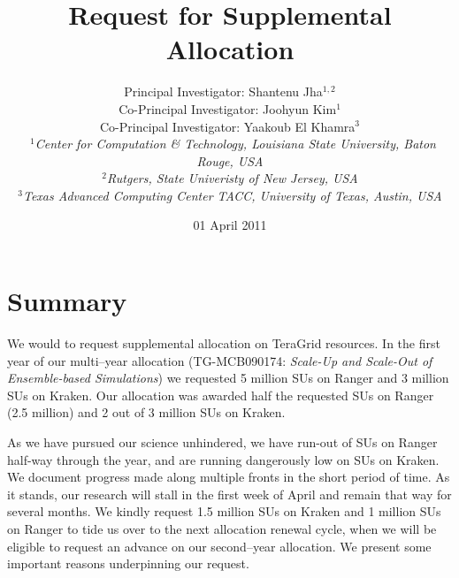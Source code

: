 \documentclass[a4paper,10pt]{article}
\begin{document}
\title{\Large Request for Supplemental Allocation}

\author{Principal Investigator: Shantenu Jha$^{1,2}$ \\ Co-Principal Investigator: Joohyun Kim$^{1}$ \\ Co-Principal Investigator: Yaakoub El Khamra$^{3}$\\\
   \small{\emph{$^{1}$Center for Computation \& Technology, Louisiana State University, Baton Rouge,
USA}}
\\
  \small{\emph{$^{2}$Rutgers, State Univeristy of New Jersey, USA}}
\\
  \small{\emph{$^{3}$Texas Advanced Computing Center TACC, University of Texas, Austin, USA}}}

\newif\ifdraft
\drafttrue
\ifdraft
\newcommand{\amnote}[1]{ {\textcolor{magenta} { ***AM: #1c }}}
\newcommand{\jhanote}[1]{ {\textcolor{red} { ***SJ: #1 }}}
\newcommand{\yyenote}[1]{ {\textcolor{blue} { ***YYE: #1 }}}
\newcommand{\michaelnote}[1]{ {\textcolor{blue} { ***MM: #1 }}}
\else
\newcommand{\amnote}[1]{}
\newcommand{\jhanote}[1]{}
\newcommand{\yyenote}[1]{}
\newcommand{\michaelnote}[1]{ {\textcolor{blue} { ***MM: #1 }}}
\fi


\date{01 April 2011}

\maketitle

\section{Summary}

We would to request supplemental allocation on TeraGrid resources. In the first year of our multi--year allocation (TG-MCB090174: {\it Scale-Up and Scale-Out of Ensemble-based Simulations}) we requested 5 million SUs on Ranger and 3 million SUs on Kraken. Our allocation was awarded half the requested SUs on Ranger (2.5 million) and 2 out of 3 million SUs on Kraken.

As we have pursued our science unhindered, we have run-out of SUs on
Ranger half-way through the year, and are running dangerously low on
SUs on Kraken.  We document progress made along multiple fronts in the
short period of time.  As it stands, our research will stall in the
first week of April and remain that way for several months.  We kindly
request 1.5 million SUs on Kraken and 1 million SUs on Ranger to tide
us over to the next allocation renewal cycle, when we will be eligible
to request an advance on our second--year allocation.  We present some
important reasons underpinning our request.
\end{document}
